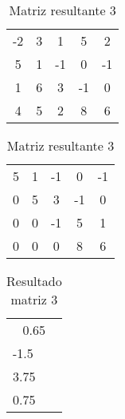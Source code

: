\documentclass[12pt]{article}
\begin{document}
\begin{table}[htb]
  \begin{minipage}[b]{.46\linewidth}

    \centering
    \begin{tabular}{|c c c c|c|}
        -2           &         3          &           1     &   5     &   2\\
        5          &         1           &          -1     &   0     &   -1\\
        1           &         6           &          3     &   -1     &   0\\
        4          &         5           &           2     &   8    &   6\\
    \end{tabular}
    \caption{Matriz de entrada 3}
    \label{tab:esq}

  \end{minipage}\hfill
  \begin{minipage}[b]{.46\linewidth}

    \centering
    \begin{tabular}{|c c c c|c|}
        5           &         1          &           -1     &   0     &   -1\\
        0          &         5           &          3     &   -1     &   0\\
        0           &         0           &          -1     &   5     &   1\\
        0           &         0           &           0     &   8    &   6\\
    \end{tabular}
    \caption{Matriz resultante 3}
    \label{tab:dir}
  \end{minipage}
\end{table}


\begin{table}[!h]
\centering
\begin{tabular}{|l|}
\multicolumn{1}{|c|}{0.65} \\
-1.5                         \\
3.75                        \\
0.75
\end{tabular}
\caption{Resultado matriz 3}
\end{table}
\end{document}
